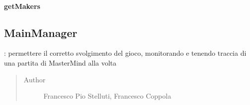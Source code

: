 \documentclass[letterpaper,10pt,italian,openany,oneside]{sphinxmanual}
\begin{document}
\begin{fulllineitems}
\label{\detokenize{source/it/unicam/cs/pa/mastermind/gamecore/GlobalSettings:it.unicam.cs.pa.mastermind.gamecore.GlobalSettings.getBreakers()}}
\end{fulllineitems}



\paragraph{getMakers}
\label{\detokenize{source/it/unicam/cs/pa/mastermind/gamecore/GlobalSettings:getmakers}}

\begin{fulllineitems}
\label{\detokenize{source/it/unicam/cs/pa/mastermind/gamecore/GlobalSettings:it.unicam.cs.pa.mastermind.gamecore.GlobalSettings.getMakers()}}
\end{fulllineitems}



\subsection{MainManager}
\label{\detokenize{source/it/unicam/cs/pa/mastermind/gamecore/MainManager:mainmanager}}\label{\detokenize{source/it/unicam/cs/pa/mastermind/gamecore/MainManager::doc}}

\begin{fulllineitems}
\label{\detokenize{source/it/unicam/cs/pa/mastermind/gamecore/MainManager:it.unicam.cs.pa.mastermind.gamecore.MainManager}}
: permettere il corretto svolgimento del gioco, monitorando e tenendo traccia di una partita di MasterMind alla volta
\begin{quote}\begin{description}
\item[{Author}] \leavevmode
Francesco Pio Stelluti, Francesco Coppola

\end{description}\end{quote}

\end{fulllineitems}
\end{document}
